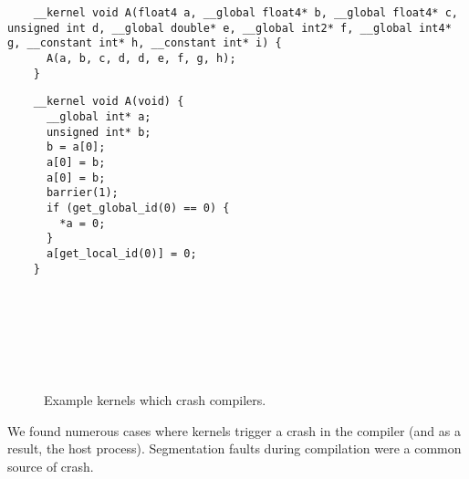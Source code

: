 \newsavebox{\NvidiaRecursionSegfault}
\begin{lrbox}{\NvidiaRecursionSegfault}
  \hspace{1.5em}
  \begin{lstlisting}
    __kernel void A(float4 a, __global float4* b, __global float4* c, unsigned int d, __global double* e, __global int2* f, __global int4* g, __constant int* h, __constant int* i) {
      A(a, b, c, d, d, e, f, g, h);
    }
  \end{lstlisting}
\end{lrbox}

\newsavebox{\XeonPhiSegfault}
\begin{lrbox}{\XeonPhiSegfault}
  \hspace{1.5em}
  \begin{lstlisting}
    __kernel void A(void) {
      __global int* a;
      unsigned int* b;
      b = a[0];
      a[0] = b;
      a[0] = b;
      barrier(1);
      if (get_global_id(0) == 0) {
        *a = 0;
      }
      a[get_local_id(0)] = 0;
    }
  \end{lstlisting}
\end{lrbox}

\begin{figure}
  \centering %
  \\%
  \\%
  \\%
  \\%
  \\%
  \caption{Example kernels which crash compilers.}%
  \label{lst:compiler-crashes}%
\end{figure}


We found numerous cases where kernels trigger a crash in the compiler (and as a result, the host process). Segmentation faults during compilation were a common source of crash.

